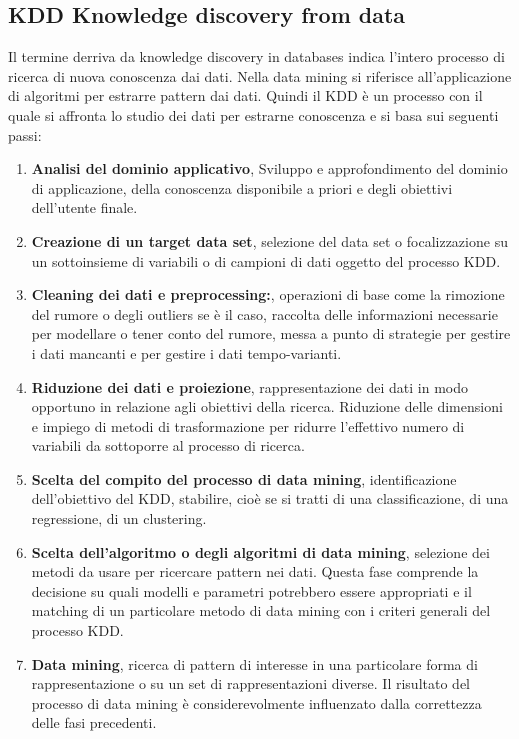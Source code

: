 \documentclass[italian,12pt,a4paper]{article}
\begin{document}
    \vspace{25pt}
    
    \subsection{KDD Knowledge discovery from data}
    Il termine derriva da knowledge discovery in databases indica l'intero processo di ricerca di nuova conoscenza dai dati. Nella data mining si riferisce all'applicazione di algoritmi per estrarre pattern dai dati. Quindi il KDD è un processo con il quale si affronta lo studio dei dati per estrarne conoscenza e si basa sui seguenti passi:

    \begin{enumerate}
		\item \textbf{Analisi del dominio applicativo}, Sviluppo e approfondimento del dominio di applicazione, della conoscenza disponibile a priori e degli obiettivi dell'utente finale.
		\item \textbf{Creazione di un target data set}, selezione del data set o focalizzazione su un sottoinsieme di variabili o di campioni di dati oggetto del processo KDD.
		\item \textbf{Cleaning dei dati e preprocessing:},  operazioni di base come la rimozione del rumore o degli outliers se è il caso, raccolta delle informazioni necessarie per modellare o tener conto del rumore, messa a punto di strategie per gestire i dati mancanti e per gestire i dati tempo-varianti.
		\item \textbf{Riduzione dei dati e proiezione}, rappresentazione dei dati in modo opportuno in relazione agli obiettivi della ricerca. Riduzione delle dimensioni e impiego di metodi di trasformazione per ridurre l'effettivo numero di variabili da sottoporre al processo di ricerca. 
		\item \textbf{Scelta del compito del processo di data mining}, identificazione dell'obiettivo del KDD, stabilire, cioè se si tratti di una classificazione, di una regressione, di un clustering.
		\item \textbf{Scelta dell'algoritmo o degli algoritmi di data mining}, selezione dei metodi da usare per ricercare pattern nei dati. Questa fase comprende la decisione su quali modelli e parametri potrebbero essere appropriati e il matching di un particolare metodo di data mining con i criteri generali del processo KDD.
        \item \textbf{Data mining}, ricerca di pattern di interesse in una particolare forma di rappresentazione o su un set di rappresentazioni diverse. Il risultato del processo di data mining è considerevolmente influenzato dalla correttezza delle fasi precedenti.

\end{enumerate}
\end{document}

